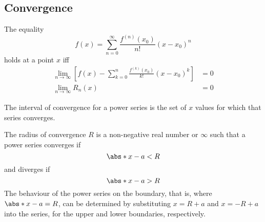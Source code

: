 \documentclass{article}
\begin{document}
\subsection{Convergence}
\begin{theorem}
    The equality
    \begin{equation*}
        f\left( x \right) = \sum_{n=0}^{\infty} \frac{f^{\left( n \right)}\left( x_0 \right)}{n!} \left( x-x_0 \right)^n
    \end{equation*}
    holds at a point \(x\) iff
    \begin{align*}
        \lim_{n\to\infty} \left[ f\left( x \right) - \sum_{k=0}^{n} \frac{f^{\left( k \right)}\left( x_0 \right)}{k!} \left( x-x_0 \right)^k \right] & = 0 \\
        \lim_{n\to\infty} R_n\left( x \right)                                                                                                        & = 0
    \end{align*}
\end{theorem}
\begin{definition}
    The interval of convergence for a power series is the set of \(x\)
    values for which that series converges.
\end{definition}
\begin{definition}
    The radius of convergence \(R\) is a non-negative real number or
    \(\infty\) such that a power series converges if
    \begin{equation*}
        \abs*{x - a} < R
    \end{equation*}
    and diverges if
    \begin{equation*}
        \abs*{x - a} > R
    \end{equation*}
    The behaviour of the power series on the boundary, that is, where
    \(\abs*{x - a} = R\), can be determined by substituting \(x = R + a\)
    and \(x = -R + a\) into the series, for the upper and lower
    boundaries, respectively.
\end{definition}
\end{document}
